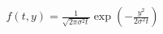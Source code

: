 \documentclass[preview]{standalone}
\begin{document}
\begin{align*}
f(t, y) = \frac{1}{\sqrt{2\pi \sigma^2 t}} \exp\left(-\frac{y^2}{2\sigma^2 t}\right)
\end{align*}
\end{document}
